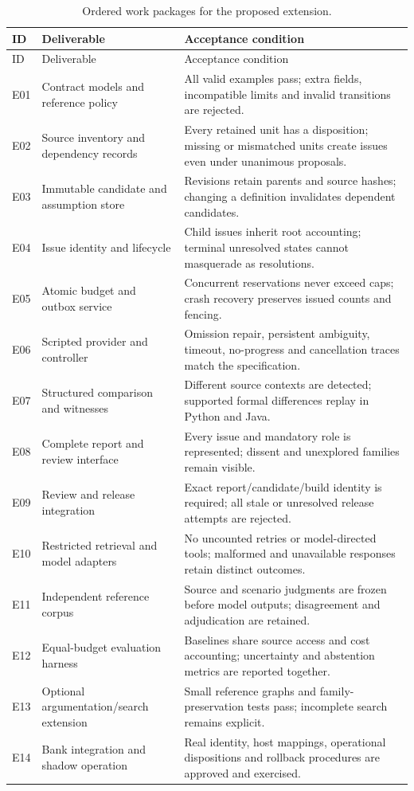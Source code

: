 \begin{longtable}{P{13mm}P{49mm}P{85mm}}
\caption{Ordered work packages for the proposed extension.}\label{tab:extension-tasks}\\
\toprule
ID & Deliverable & Acceptance condition\\\midrule\endfirsthead
\toprule ID & Deliverable & Acceptance condition\\\midrule\endhead
E01 & Contract models and reference policy & All valid examples pass; extra fields, incompatible limits and invalid transitions are rejected.\\
E02 & Source inventory and dependency records & Every retained unit has a disposition; missing or mismatched units create issues even under unanimous proposals.\\
E03 & Immutable candidate and assumption store & Revisions retain parents and source hashes; changing a definition invalidates dependent candidates.\\
E04 & Issue identity and lifecycle & Child issues inherit root accounting; terminal unresolved states cannot masquerade as resolutions.\\
E05 & Atomic budget and outbox service & Concurrent reservations never exceed caps; crash recovery preserves issued counts and fencing.\\
E06 & Scripted provider and controller & Omission repair, persistent ambiguity, timeout, no-progress and cancellation traces match the specification.\\
E07 & Structured comparison and witnesses & Different source contexts are detected; supported formal differences replay in Python and Java.\\
E08 & Complete report and review interface & Every issue and mandatory role is represented; dissent and unexplored families remain visible.\\
E09 & Review and release integration & Exact report/candidate/build identity is required; all stale or unresolved release attempts are rejected.\\
E10 & Restricted retrieval and model adapters & No uncounted retries or model-directed tools; malformed and unavailable responses retain distinct outcomes.\\
E11 & Independent reference corpus & Source and scenario judgments are frozen before model outputs; disagreement and adjudication are retained.\\
E12 & Equal-budget evaluation harness & Baselines share source access and cost accounting; uncertainty and abstention metrics are reported together.\\
E13 & Optional argumentation/search extension & Small reference graphs and family-preservation tests pass; incomplete search remains explicit.\\
E14 & Bank integration and shadow operation & Real identity, host mappings, operational dispositions and rollback procedures are approved and exercised.\\
\bottomrule
\end{longtable}

